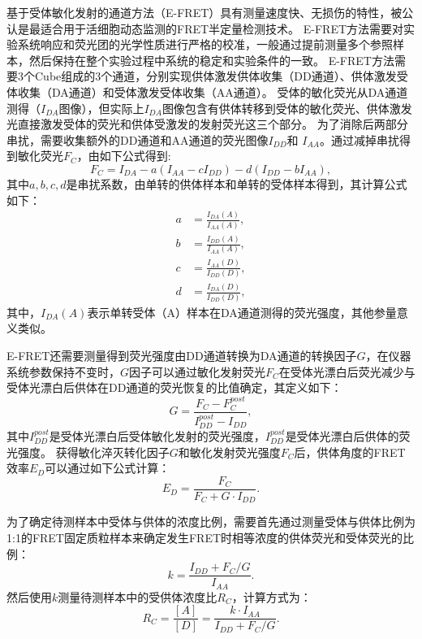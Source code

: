 基于受体敏化发射的通道方法（E-FRET）具有测量速度快、无损伤的特性，被公认是最适合用于活细胞动态监测的FRET半定量检测技术。
E-FRET方法需要对实验系统响应和荧光团的光学性质进行严格的校准，一般通过提前测量多个参照样本，然后保持在整个实验过程中系统的稳定和实验条件的一致。
E-FRET方法需要3个Cube组成的3个通道，分别实现供体激发供体收集（DD通道）、供体激发受体收集（DA通道）和受体激发受体收集（AA通道）。
受体的敏化荧光从DA通道测得（$I_{DA}$图像），但实际上$I_{DA}$图像包含有供体转移到受体的敏化荧光、供体激发光直接激发受体的荧光和供体受激发的发射荧光这三个部分。
为了消除后两部分串扰，需要收集额外的DD通道和AA通道的荧光图像$I_{DD}$和 $I_{AA}$。通过减掉串扰得到敏化荧光$F_C$，由如下公式得到:
\begin{equation}
F_C=I_{DA}-a(I_{AA}-cI_{DD})-d(I_{DD}-bI_{AA}) ,
\label{eq:fc}
\end{equation}
其中$a, b, c, d$是串扰系数，由单转的供体样本和单转的受体样本得到，其计算公式如下：
\begin{align}
a&=\frac{I_{DA}(A)}{I_{AA}(A)}, \label{eq:a}\\
b&=\frac{I_{DD}(A)}{I_{AA}(A)}, \label{eq:b}\\ 
c&=\frac{I_{AA}(D)}{I_{DD}(D)}, \label{eq:c}\\ 
d&=\frac{I_{DA}(D)}{I_{DD}(D)}, \label{eq:d}
\end{align}
其中，$I_{DA}(A)$表示单转受体（A）样本在DA通道测得的荧光强度，其他参量意义类似。

E-FRET还需要测量得到荧光强度由DD通道转换为DA通道的转换因子$G$，在仪器系统参数保持不变时，$G$因子可以通过敏化发射荧光$F_C$在受体光漂白后荧光减少与受体光漂白后供体在DD通道的荧光恢复的比值确定，其定义如下：
\begin{equation}
    G=\frac{F_C-F_C^{post}}{I_{DD}^{post}-I_{DD}}, 
    \label{eq:g}
\end{equation}
其中$I_{DD}^{post}$是受体光漂白后受体敏化发射的荧光强度，$I_{DD}^{post}$是受体光漂白后供体的荧光强度。
获得敏化淬灭转化因子$G$和敏化发射荧光强度$F_C$后，供体角度的FRET效率$E_D$可以通过如下公式计算：
\begin{equation}
    E_D=\frac{F_C}{F_C+G \cdot I_{DD}}.
    \label{eq:ed}
\end{equation}

为了确定待测样本中受体与供体的浓度比例，需要首先通过测量受体与供体比例为1:1的FRET固定质粒样本来确定发生FRET时相等浓度的供体荧光和受体荧光的比例：
\begin{equation}
    k=\frac{I_{DD}+F_C/G}{I_{AA}}.
    \label{eq:k}
\end{equation}
然后使用$k$测量待测样本中的受供体浓度比$R_C$，计算方式为：
\begin{equation}
    R_C = \frac{[A]}{[D]} = \frac{k \cdot I_{AA}}{I_{DD} + F_C/G}.
    \label{eq:rc}
\end{equation}

